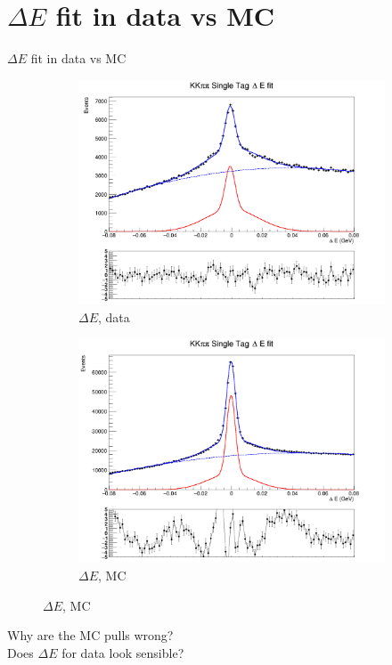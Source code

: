 \documentclass{beamer}
\begin{document}
\section{$\Delta E$ fit in data vs MC}
\begin{frame}{$\Delta E$ fit in data vs MC}
  \begin{figure}
    \centering
    \begin{subfigure}{0.5\textwidth}
      \centering
      \includegraphics[width=\textwidth]{KKpipiSingleTagPlot.png}
      \caption{$\Delta E$, data}
    \end{subfigure}%
    \begin{subfigure}{0.5\textwidth}
      \centering
      \includegraphics[width=\textwidth]{KKpipiSingleTagDeltaEPlot.png}
      \caption{$\Delta E$, MC}
    \end{subfigure}
  \end{figure}
  Why are the MC pulls wrong? \\
  Does $\Delta E$ for data look sensible?
\end{frame}
\end{document}
